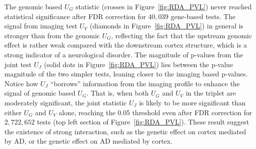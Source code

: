 \documentclass[11pt]{article}
\begin{document}
The genomic based $U_G$ statistic (crosses in Figure~\ref{fig:RDA_PVL}) never reached statistical significance after FDR correction for $40,039$ gene-based tests. The signal from imaging test $U_V$ (diamonds in Figure~\ref{fig:RDA_PVL}) in general is stronger than from the genomic $U_G$, reflecting the fact that the upstream genomic effect is rather weak compared with the downstream cortex structure, which is a strong indicator of a neurological disorder. The magnitude of p-values from the joint test $U_J$ (solid dots in Figure~\ref{fig:RDA_PVL}) lies between the p-value magnitude of the two simpler tests, leaning closer to the imaging based p-values. Notice how $U_J$ ``borrows'' information from the imaging profile to enhance the signal of genomic based $U_G$. That is, when both $U_G$ and $U_V$ in the triplet are moderately significant, the joint statistic $U_J$ is likely to be more significant than either $U_G$ and $U_V$ alone, reaching the 0.05 threshold even after FDR correction for $2,722,652$ tests (top left section of Figure~\ref{fig:RDA_PVL}). These result suggest the existence of strong interaction, such as the genetic effect on cortex mediated by AD, or the genetic effect on AD mediated by cortex.
\end{document}
